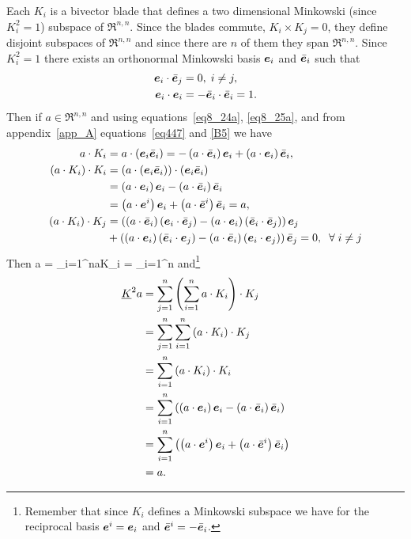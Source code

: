 Each $K_{i}$ is a bivector blade that defines a two dimensional Minkowski (since $K_{i}^{2}=1$) subspace of $\Re^{n,n}$. 
Since the blades commute, $K_{i}\times K_{j} = 0$, they define disjoint subspaces of $\Re^{n,n}$ and since there are 
$n$ of them they span $\Re^{n,n}$. Since $K_{i}^{2}=1$ there exists an orthonormal Minkowski basis $\bm{e}_{i}$ and
$\bar{\bm{e}}_{i}$ such that
\begin{align}
	\bm{e}_{i}\cdot\bar{\bm{e}}_{j} &= 0,\;i\ne j, \label{eq8_24a}\\
	\bm{e}_{i}\cdot\bm{e}_{i} &= -\bar{\bm{e}}_{i}\cdot\bar{\bm{e}}_{i} = 1. \label{eq8_25a}
\end{align}
Then if $a\in \Re^{n,n}$ and using equations~\ref{eq8_24a}, \ref{eq8_25a}, and from
appendix~\ref{app_A} equations~\ref{eq447} and \ref{B5} we have
\begin{align}
	a\cdot K_{i} &= a\cdot\left ( {\bm{e}_{i}\bar{\bm{e}}_{i}} \right ) = 
	                -\left ( {a\cdot\bar{\bm{e}}_{i}} \right )\bm{e}_{i}+\left ( {a\cdot\bm{e}_{i}} \right )\bar{\bm{e}}_{i}, \\
	\left ( {a\cdot K_{i}} \right )\cdot K_{i} &= \left ( {a\cdot\left ( {\bm{e}_{i}\bar{\bm{e}}_{i}} \right )} \right )\cdot\left ( {\bm{e}_{i}\bar{\bm{e}}_{i}} \right ) \nonumber \\
	                 &= \left ( {a\cdot\bm{e}_{i}} \right )\bm{e}_{i}-\left ( {a\cdot\bar{\bm{e}}_{i}} \right )\bar{\bm{e}}_{i} \nonumber \\
	                 &= \left ( {a\cdot\bm{e}^{i}} \right )\bm{e}_{i}+\left ( {a\cdot\bar{\bm{e}}^{i}} \right )\bar{\bm{e}}_{i} = a, \\
	\left ( {a\cdot K_{i}} \right )\cdot K_{j} &= \left ( {\left ( {a\cdot \bar{\bm{e}}_{i}} \right )\left ( {\bm{e}_{i}\cdot \bar{\bm{e}}_{j}} \right )
	                                  -\left ( {a\cdot \bm{e}_{i}} \right )\left ( {\bar{\bm{e}}_{i}\cdot \bar{\bm{e}}_{j}} \right )} \right )\bm{e}_{j} \\ \nonumber
	                                &  +\left ( {\left ( {a\cdot \bm{e}_{i}} \right )\left ( {\bar{\bm{e}}_{i}\cdot \bm{e}_{j}} \right )
	                                  -\left ( {a\cdot \bar{\bm{e}}_{i}} \right )\left ( {\bm{e}_{i}\cdot \bm{e}_{j}} \right )} \right )\bar{\bm{e}}_{j} = 0, \;\;\forall\; i \ne j
\end{align}
Then
\be\label{eq8_29}
	a = \sum_{i=1}^{n}a\cdot K_{i} = \sum_{i=1}^{n}
\ee
and\footnote{Remember that since $K_{i}$ defines a Minkowski subspace we have for the reciprocal
basis $\bm{e}^{i}=\bm{e}_{i}$ and $\bar{\bm{e}}^{i}=-\bar{\bm{e}}_{i}$.}
\begin{align}
	\underline{K}^{2}a &= \sum_{j=1}^{n}\left ( {\sum_{i=1}^{n}a\cdot K_{i}} \right )\cdot K_{j} \nonumber \\
	                    &= \sum_{j=1}^{n}\sum_{i=1}^{n}\left ( {a\cdot K_{i}} \right )\cdot K_{j} \nonumber \\
	                    &= \sum_{i=1}^{n}\left ( {a\cdot K_{i}} \right )\cdot K_{i} \nonumber \\
	                    &= \sum_{i=1}^{n}\left ( {\left ( {a\cdot\bm{e}_{i}} \right )\bm{e}_{i}
	                    -\left ( {a\cdot\bar{\bm{e}}_{i}} \right )\bar{\bm{e}}_{i}} \right ) \nonumber \\
					    &= \sum_{i=1}^{n}\left ( {\left ( {a\cdot\bm{e}^{i}} \right )\bm{e}_{i}
	                    +\left ( {a\cdot\bar{\bm{e}}^{i}} \right )\bar{\bm{e}}_{i}} \right ) \nonumber \\
	                    &= a.
\end{align}
